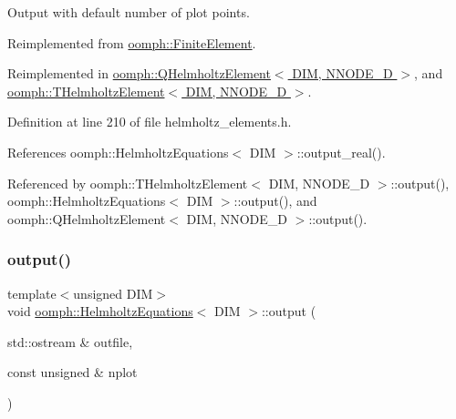 Output with default number of plot points. 



Reimplemented from \hyperlink{classoomph_1_1FiniteElement_a2ad98a3d2ef4999f1bef62c0ff13f2a7}{oomph\+::\+Finite\+Element}.



Reimplemented in \hyperlink{classoomph_1_1QHelmholtzElement_ab64bdf668cacf69003ddc36832b29559}{oomph\+::\+Q\+Helmholtz\+Element$<$ D\+I\+M, N\+N\+O\+D\+E\+\_\+D $>$}, and \hyperlink{classoomph_1_1THelmholtzElement_a563752a21a9e84091bd5c6c8c5a3e750}{oomph\+::\+T\+Helmholtz\+Element$<$ D\+I\+M, N\+N\+O\+D\+E\+\_\+D $>$}.



Definition at line 210 of file helmholtz\+\_\+elements.\+h.



References oomph\+::\+Helmholtz\+Equations$<$ D\+I\+M $>$\+::output\+\_\+real().



Referenced by oomph\+::\+T\+Helmholtz\+Element$<$ D\+I\+M, N\+N\+O\+D\+E\+\_\+D $>$\+::output(), oomph\+::\+Helmholtz\+Equations$<$ D\+I\+M $>$\+::output(), and oomph\+::\+Q\+Helmholtz\+Element$<$ D\+I\+M, N\+N\+O\+D\+E\+\_\+D $>$\+::output().

\mbox{\label{classoomph_1_1HelmholtzEquations_a63c04aa6b9ee38cb75417b2de9e45f24}} 
\subsubsection{\texorpdfstring{output()}{output()}\hspace{0.1cm}{\footnotesize\ttfamily [2/4]}}
{\footnotesize\ttfamily template$<$unsigned D\+IM$>$ \\
void \hyperlink{classoomph_1_1HelmholtzEquations}{oomph\+::\+Helmholtz\+Equations}$<$ D\+IM $>$\+::output (\begin{DoxyParamCaption}\item[{std\+::ostream \&}]{outfile,  }\item[{const unsigned \&}]{nplot }\end{DoxyParamCaption})\hspace{0.3cm}{\ttfamily [virtual]}}



